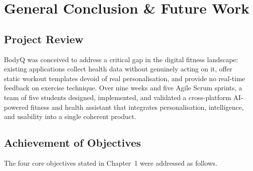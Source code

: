 
\chapter{General Conclusion \& Future Work}

\section{Project Review}

BodyQ was conceived to address a critical gap in the digital fitness
landscape: existing applications collect health data without genuinely
acting on it, offer static workout templates devoid of real
personalisation, and provide no real-time feedback on exercise technique.
Over nine weeks and five Agile Scrum sprints, a team of five students
designed, implemented, and validated a cross-platform AI-powered fitness
and health assistant that integrates personalisation, intelligence, and
usability into a single coherent product.

\section{Achievement of Objectives}

The four core objectives stated in Chapter~1 were addressed as follows.

